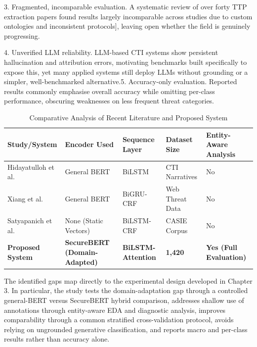\documentclass[12pt,a4paper]{report}
\begin{document}
3. Fragmented, incomparable evaluation. A systematic review of over
forty TTP extraction papers found results largely incomparable across
studies due to custom ontologies and inconsistent
protocols\cite{buechel2025sok}{]}, leaving open whether the field
is genuinely progressing.

4. Unverified LLM reliability. LLM-based CTI systems show persistent
hallucination and attribution errors, motivating benchmarks built
specifically to expose this\cite{ctibench2024}, yet many
applied systems still deploy LLMs without grounding or a simpler,
well-benchmarked alternative.5. Accuracy-only evaluation. Reported
results commonly emphasise overall accuracy while omitting per-class
performance, obscuring weaknesses on less frequent threat categories.
\begin{table}[htbp]
\centering
\caption{Comparative Analysis of Recent Literature and Proposed System}
\label{tab:literature-comparison}

\renewcommand{\arraystretch}{1.35}
\small

\begin{tabularx}{\textwidth}{
>{\raggedright\arraybackslash}X
>{\raggedright\arraybackslash}X
>{\raggedright\arraybackslash}X
>{\centering\arraybackslash}m{2.1cm}
>{\centering\arraybackslash}m{2.3cm}
}
\toprule

\textbf{Study/System} &
\textbf{Encoder Used} &
\textbf{Sequence Layer} &
\textbf{Dataset Size} &
\textbf{Entity-Aware Analysis} \\

\midrule

Hidayatulloh et al.~\cite{hidayatulloh2026hybrid} &
General BERT &
BiLSTM &
CTI Narratives &
No \\

Xiang et al.~\cite{xiang2023apt} &
General BERT &
BiGRU-CRF &
Web Threat Data &
No \\

Satyapanich et al.~\cite{casie2020} &
None (Static Vectors) &
BiLSTM-CRF &
CASIE Corpus &
No \\


\textbf{Proposed System} &
\textbf{SecureBERT (Domain-Adapted)} &
\textbf{BiLSTM-Attention} &
\textbf{1,420} &
\textbf{Yes (Full Evaluation)} \\

\bottomrule
\end{tabularx}
\end{table}
The identified gaps map directly to the experimental design developed in
Chapter 3. In particular, the study tests the domain-adaptation gap
through a controlled general-BERT versus SecureBERT hybrid comparison,
addresses shallow use of annotations through entity-aware EDA and
diagnostic analysis, improves comparability through a common stratified
cross-validation protocol, avoids relying on ungrounded generative
classification, and reports macro and per-class results rather than
accuracy alone.
\end{document}
